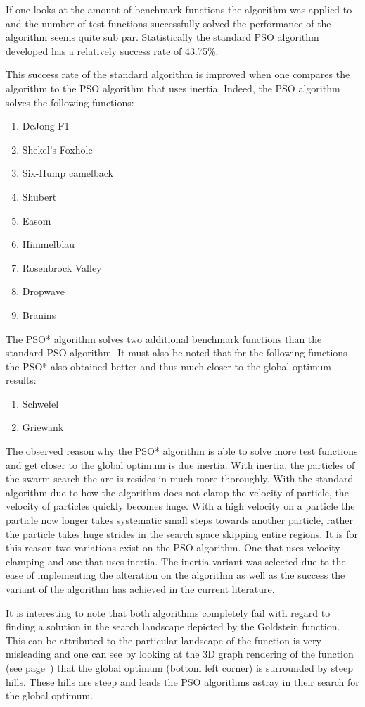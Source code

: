 If one looks at the amount of benchmark functions the algorithm was applied to and the number of test functions successfully solved the performance of the algorithm seems quite sub par. Statistically the standard PSO algorithm developed has a relatively success rate of 43.75\%.

This success rate of the standard algorithm is improved when one compares the algorithm to the PSO algorithm that uses inertia. Indeed, the PSO algorithm solves the following functions:
\begin{enumerate}
\item DeJong F1 
\item Shekel's Foxhole
\item Six-Hump camelback
\item Shubert
\item Easom
\item Himmelblau
\item Rosenbrock Valley
\item Dropwave
\item Branins
\end{enumerate}
The PSO* algorithm solves two additional benchmark functions than the standard PSO algorithm. It must also be noted that for the following functions the PSO* also obtained better and thus much closer to the global optimum results:
\begin{enumerate}
\item Schwefel
\item Griewank
\end{enumerate}
The observed reason why the PSO* algorithm is able to solve more test functions and get closer to the global optimum is due inertia. With inertia, the particles of the swarm search the are is resides in much more thoroughly. With the standard algorithm due to how the algorithm does not clamp the velocity of particle, the velocity of particles quickly becomes huge. With a high velocity on a particle the particle now longer takes systematic small steps towards another particle, rather the particle takes huge strides in the search space skipping entire regions. It is for this reason two variations exist on the PSO algorithm. One that uses velocity clamping and one that uses inertia. The inertia variant was selected due to the ease of implementing the alteration on the algorithm as well as the success the variant of the algorithm has achieved in the current literature.

It is interesting to note that both algorithms completely fail with regard to finding a solution in the search landscape depicted by the Goldstein function. This can be attributed to the particular landscape of the function is very misleading and one can see by looking at the 3D graph rendering of the function (see page~\pageref{fig:GoldsteinGraph}) that the global optimum (bottom left corner) is surrounded by steep hills. These hills are steep and leads the PSO algorithms astray in their search for the global optimum.

